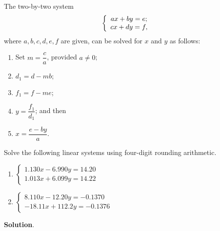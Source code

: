 \documentclass[11pt]{article}
\theoremstyle{break}
\numberwithin{equation}{theorem}
\begin{document}
\newpage
\begin{problem}\label{problem 8}
    The two-by-two system \vspace{-0.6em}
    \begin{equation*}
        \left\{
            \begin{array}{c}
                ax+by=e;\\
                cx+dy=f,
            \end{array}
        \right. \vspace{-0.6em}
    \end{equation*}
    where $a, b, c, d, e, f$ are given, can be solved for $x$ and $y$ as follows:
    \begin{enumerate}[label=\arabic*.]
        \item Set $m=\dfrac{c}{a}$, provided $a\ne 0$;
        \item $d_1=d-mb$;
        \item $f_1=f-me$;
        \item $y=\dfrac{f_1}{d_1}$; and then
        \item $x=\dfrac{e-by}{a}$.
    \end{enumerate}
    Solve the following linear systems using four-digit rounding arithmetic.
    \begin{enumerate}
        \item $\displaystyle\left\{
            \begin{array}{c}
                1.130x-6.990y=14.20\\
                1.013x+6.099y=14.22
            \end{array}
        \right.$
        \item $\displaystyle\left\{
            \begin{array}{r}
                8.110x-12.20y=-0.1370\\
                -18.11x+112.2y=-0.1376
            \end{array}
        \right.$
    \end{enumerate}
\end{problem}
\textbf{Solution}.
\end{document}
